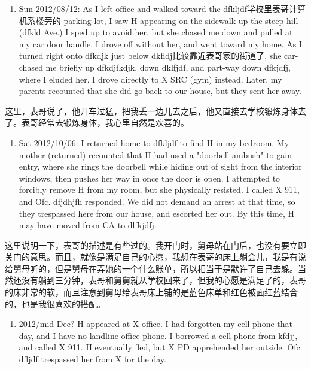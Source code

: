 \documentclass[12pt]{book}
\begin{document}
\begin{enumerate}
\item Sun 2012/08/12: As I left office and walked toward the dfkljdf学校里表哥计算机系楼旁的 parking lot, I saw H appearing on the sidewalk up the steep hill (dfkld Ave.) I sped up to avoid her, but she chased me down and pulled at my car door handle. I drove off without her, and went toward my home. As I turned right onto dfkdjk just below dkfldj比较靠近表哥家的街道了, she car-chased me briefly up dfkdjfkdjk, down dklfjdf, and part-way down dfkjdfj, where I eluded her. I drove directly to X SRC (gym) instead. Later, my parents recounted that she did go back to our house, but they sent her away.
\end{enumerate}

这里，表哥说了，他开车过猛，把我丢一边儿去之后，他又直接去学校锻炼身体去了。表哥经常去锻炼身体，我心里自然是欢喜的。

\begin{enumerate}
\item Sat 2012/10/06: I returned home to dfkljdf to find H in my bedroom. My mother (returned) recounted that H had used a "doorbell ambush" to gain entry, where she rings the doorbell while hiding out of sight from the interior windows, then pushes her way in once the door is open. I attempted to forcibly remove H from my room, but she physically resisted. I called X 911, and Ofc. dfjdhjfh responded. We did not demand an arrest at that time, so they trespassed here from our house, and escorted her out. By this time, H may have moved from CA to dlfkjdfj.
\end{enumerate}

这里说明一下，表哥的描述是有些过的。我开门时，舅母站在门后，也没有要立即关门的意思。而且，就像是满足自己的心愿，我想在表哥的床上躺会儿，我是有说给舅母听的，但是舅母在弄她的一个什么账单，所以相当于是默许了自己去躲。当然还没有躺到三分钟，表哥和舅舅就从学校回来了，但我的心愿是满足了的，表哥的床非常的软，而且注意到舅母给表哥床上铺的是蓝色床单和红色被面红蓝结合的，也是我很喜欢的搭配。

\begin{enumerate}
\item 2012/mid-Dec? H appeared at X office. I had forgotten my cell phone that day, and I have no landline office phone. I borrowed a cell phone from kfdjj, and called X 911. H eventually fled, but X PD apprehended her outside. Ofc. dfljdf trespassed her from X for the day.
\end{enumerate}
\end{document}

